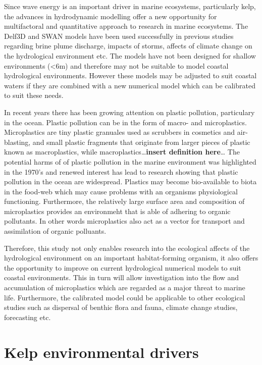 \documentclass[]{article}
\begin{document}
Since wave energy is an important driver in marine ecosystems,
particularly kelp, the advances in hydrodynamic modelling offer a new
opportunity for multifactoral and quantitative approach to research in
marine ecosystems. The Delf3D and SWAN models have been used
successfully in previous studies regarding brine plume discharge,
impacts of storms, affects of climate change on the hydrological
environment etc. The models have not been designed for shallow
environments (\textless{}6m) and therefore may not be suitable to model
coastal hydrological environments. However these models may be adjusted
to suit coastal waters if they are combined with a new numerical model
which can be calibrated to suit these needs.

In recent years there has been growing attention on plastic pollution,
particulary in the ocean. Plastic pollution can be in the form of macro-
and microplastics. Microplastics are tiny plastic granuales used as
scrubbers in cosmetics and air-blasting, and small plastic fragments
that originate from larger pieces of plastic known as macroplastics,
while macroplastics\ldots{}\textbf{insert definition here}\ldots{} The
potential harms of of plastic pollution in the marine environment was
highlighted in the 1970's and renewed interest has lead to research
showing that plastic pollution in the ocean are widespread. Plastics may
become bio-available to biota in the food-web which may cause problems
with an organisms physiological functioning. Furthermore, the relatively
large surface area and composition of microplastics provides an
environmeht that is able of adhering to organic pollutants. In other
words microplastics also act as a vector for transport and assimilation
of organic polluants.

Therefore, this study not only enables research into the ecological
affects of the hydrological environment on an important habitat-forming
organism, it also offers the opportunity to improve on current
hydrological numerical models to suit coastal environments. This in turn
will allow investigation into the flow and accumulation of microplastics
which are regarded as a major threat to marine life. Furthermore, the
calibrated model could be applicable to other ecological studies such as
dispersal of benthic flora and fauna, climate change studies,
forecasting etc.

\section{Kelp environmental drivers}\label{kelp-environmental-drivers}
\end{document}
